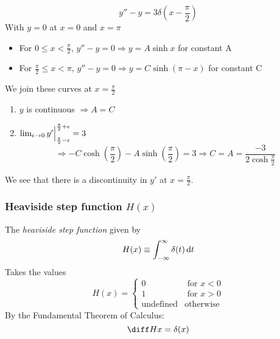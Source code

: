 \documentclass{article}
\begin{document}
\begin{eg}
    \[
        y'' - y = 3 \delta(x - \frac{\pi}{2})  
    \]
    With $y = 0$ at $x = 0$ and $x = \pi$
    \begin{itemize}
        \item For $0 \leq x < \frac{\pi}{2}$, $y'' - y = 0 \Rightarrow y = A \sinh x$ for constant A
        \item For $\frac{\pi}{2} \leq x < \pi$, $y'' - y = 0 \Rightarrow y = C \sinh (\pi - x)$ for constant C
    \end{itemize}
    We join these curves at $x = \frac{\pi}{2}$
    \begin{enumerate}
        \item $y$ is continuous $\Rightarrow A = C$
        \item $\lim_{\epsilon \rightarrow 0} y' \Big{|}_{\frac{\pi}{2} - \epsilon}^{\frac{\pi}{2} + \epsilon} = 3$
        \[
            \Rightarrow -C \cosh(\frac{\pi}{2}) - A \sinh(\frac{\pi}{2}) = 3 \Rightarrow C = A = \frac{-3}{2 \cosh{\frac{\pi}{2}}} 
        \]
    \end{enumerate}

    \begin{center}
    \end{center}

    We see that there is a discontinuity in $y'$ at $x = \frac{\pi}{2}$.
\end{eg}
\subsubsection{Heaviside step function $H(x)$}
\begin{defi}
    The \emph{heaviside step function} given by
    \[
        H(x) \equiv \int_{-\infty}^{\infty} {\delta(t) \mathop{}\!\mathrm{d} t} 
    \]
    Takes the values
    \[
        H(x) = \begin{cases}
            0 & \text{ for } x < 0 \\
            1 & \text{ for } x > 0 \\
            \text{undefined} & \text{otherwise}
        \end{cases}
    \]  
    By the Fundamental Theorem of Calculus:
    \[
        \diff Hx = \delta(x)
    \]
\end{defi}
\end{document}
